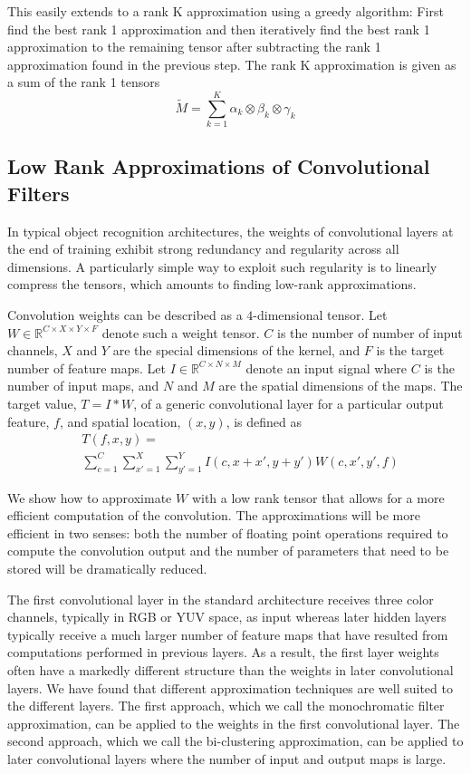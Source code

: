 This easily extends to a rank K approximation using a greedy algorithm: First find the best rank 1 approximation and then iteratively find the best rank 1 approximation to the remaining tensor after subtracting the rank 1 approximation found in the previous step. %
 The rank K approximation is given as a sum of the rank 1 tensors  
\begin{equation*}
	\tilde{M} = \sum_{k = 1}^{K} \alpha_k \otimes \beta_k \otimes \gamma_k 
\end{equation*} 

\subsection{Low Rank Approximations of Convolutional Filters}

In typical object recognition architectures, the weights of convolutional layers at the end of training exhibit strong redundancy and regularity across all dimensions. A particularly simple way to exploit such regularity is to 
linearly compress the tensors, which amounts to finding low-rank approximations.

Convolution weights can be described as a $4$-dimensional tensor. Let $W \in \mathbb{R}^{C \times X \times Y \times F}$ 
denote such a weight tensor. $C$ is the number of number of input channels, $X$ and $Y$ are the special dimensions of the kernel, and $F$ is the target number of feature maps.
Let $I \in \mathbb{R}^{C \times N \times M}$ denote an input signal where $C$ is the number of input maps, and $N$ and $M$ are the spatial dimensions of the maps.
The target value, $T = I \ast W$, of a generic convolutional layer for a particular output feature, $f$, and spatial location, $(x, y)$, is defined as
\begin{align*}
\label{convlayereq}
&T(f,x,y) = \\
&\sum_{c=1}^C \sum_{x'=1}^{X} \sum_{y'=1}^{Y} I(c,x+x',y+y') W(c,x',y',f)
\end{align*}

We show how to approximate $W$ with a low rank tensor that allows for a more efficient computation of the convolution. The approximations will be more efficient in two senses: both the number of floating point operations required to compute the convolution output and the number of parameters that need to be stored will be dramatically reduced. 

The first convolutional layer in the standard architecture receives three color channels, typically in RGB or YUV space, as input whereas later hidden layers typically receive a much larger number of feature maps that have resulted from computations performed in previous layers. As a result, the first layer weights often have a markedly different structure than the weights in later convolutional layers. We have found that different approximation techniques are well suited to the different layers. The first approach, which we call the monochromatic filter approximation, can be applied to the weights in the first convolutional layer. The second approach, which we call the bi-clustering approximation, can be applied to later convolutional layers where the number of input and output maps is large. 
